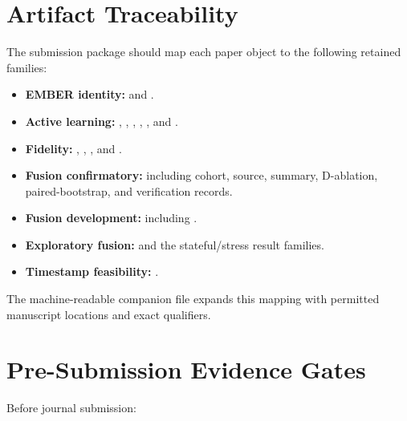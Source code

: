 \section{Artifact Traceability}

The submission package should map each paper object to the following retained
families:

\begin{itemize}
    \item \textbf{EMBER identity:}
     and .
    \item \textbf{Active learning:} ,
    ,
    ,
    ,
    , and .
    \item \textbf{Fidelity:} ,
    ,
    , and
    .
    \item \textbf{Fusion confirmatory:}
    including cohort, source, summary, D-ablation, paired-bootstrap, and
    verification records.
    \item \textbf{Fusion development:}
    including .
    \item \textbf{Exploratory fusion:}
    and the stateful/stress result families.
    \item \textbf{Timestamp feasibility:}
    .
\end{itemize}

The machine-readable companion file  expands
this mapping with permitted manuscript locations and exact qualifiers.

\section{Pre-Submission Evidence Gates}

Before journal submission:

